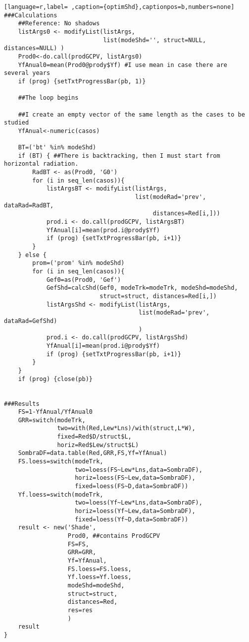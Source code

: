 \begin{lstlisting}[language=r,label= ,caption={optimShd},captionpos=b,numbers=none]
###Calculations	
    ##Reference: No shadows	
    listArgs0 <- modifyList(listArgs,
                            list(modeShd='', struct=NULL, distances=NULL) )
    Prod0<-do.call(prodGCPV, listArgs0)
    YfAnual0=mean(Prod0@prody$Yf) #I use mean in case there are several years
    if (prog) {setTxtProgressBar(pb, 1)}

    ##The loop begins

    ##I create an empty vector of the same length as the cases to be studied
    YfAnual<-numeric(casos) 

    BT=('bt' %in% modeShd)
    if (BT) { ##There is backtracking, then I must start from horizontal radiation.
        RadBT <- as(Prod0, 'G0')
        for (i in seq_len(casos)){
            listArgsBT <- modifyList(listArgs,
                                     list(modeRad='prev', dataRad=RadBT,
                                          distances=Red[i,]))
            prod.i <- do.call(prodGCPV, listArgsBT)
            YfAnual[i]=mean(prod.i@prody$Yf)
            if (prog) {setTxtProgressBar(pb, i+1)}
        }
    } else {
        prom=('prom' %in% modeShd)
        for (i in seq_len(casos)){
            Gef0=as(Prod0, 'Gef')
            GefShd=calcShd(Gef0, modeTrk=modeTrk, modeShd=modeShd,
                           struct=struct, distances=Red[i,])
            listArgsShd <- modifyList(listArgs,
                                      list(modeRad='prev', dataRad=GefShd)
                                      )
            prod.i <- do.call(prodGCPV, listArgsShd)
            YfAnual[i]=mean(prod.i@prody$Yf)
            if (prog) {setTxtProgressBar(pb, i+1)}
        }
    }
    if (prog) {close(pb)}


###Results
    FS=1-YfAnual/YfAnual0
    GRR=switch(modeTrk,
               two=with(Red,Lew*Lns)/with(struct,L*W),
               fixed=Red$D/struct$L,
               horiz=Red$Lew/struct$L)
    SombraDF=data.table(Red,GRR,FS,Yf=YfAnual)
    FS.loess=switch(modeTrk,
                    two=loess(FS~Lew*Lns,data=SombraDF),
                    horiz=loess(FS~Lew,data=SombraDF),
                    fixed=loess(FS~D,data=SombraDF))
    Yf.loess=switch(modeTrk,
                    two=loess(Yf~Lew*Lns,data=SombraDF),
                    horiz=loess(Yf~Lew,data=SombraDF),
                    fixed=loess(Yf~D,data=SombraDF))
    result <- new('Shade',
                  Prod0, ##contains ProdGCPV
                  FS=FS,
                  GRR=GRR,
                  Yf=YfAnual,
                  FS.loess=FS.loess,
                  Yf.loess=Yf.loess,
                  modeShd=modeShd,
                  struct=struct,
                  distances=Red,
                  res=res
                  )
    result
}
\end{lstlisting}
